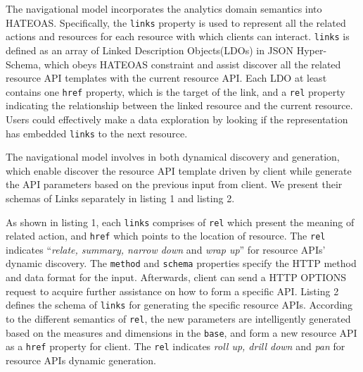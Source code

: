 \documentclass[10pt, conference, compsocconf]{IEEEtran}
\begin{document}
The navigational model incorporates the analytics domain semantics into HATEOAS. Specifically, the \texttt{links} property is used to represent all the related actions and resources for each resource with which clients can interact. \texttt{links} is defined as an array of Linked Description Objects(LDOs) in JSON Hyper-Schema\cite{JSONSchema}, which obeys HATEOAS constraint and assist discover all the related resource API templates with the current resource API.  Each LDO at least contains one \texttt{href} property, which is the target of the link, and a \texttt{rel} property indicating the relationship between the linked resource and the current resource. Users could effectively make a data exploration by looking if the representation has embedded \texttt{links} to the next resource. 

The navigational model involves in both dynamical discovery and generation, which enable discover the resource API template driven by client while generate the API parameters based on the previous input from client. We present their schemas of Links separately in listing 1 and listing 2. 

As shown in listing 1, each \texttt{links} comprises of \texttt{rel} which present the meaning of related action, and \texttt{href} which points to the location of resource. The \texttt{rel} indicates “\textit{relate, summary, narrow down} and \textit{wrap up}” for resource APIs' dynamic discovery. The \texttt{method} and \texttt{schema} properties specify the HTTP method and data format for the input. Afterwards, client can send a HTTP OPTIONS request to acquire further assistance on how to form a specific API. Listing 2 defines the schema of \texttt{links} for generating the specific resource APIs. According to the different semantics of \texttt{rel}, the new parameters are intelligently generated based on the measures and dimensions in the \texttt{base}, and form a new resource API as a \texttt{href} property for client. The \texttt{rel} indicates \textit{roll up, drill down} and \textit{pan} for resource APIs dynamic generation.
\lstset{style=mystyle}
\end{document}
